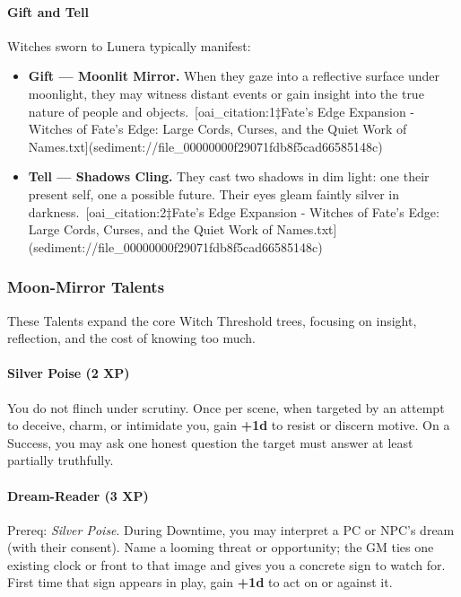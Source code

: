 \documentclass[11pt]{book}
\begin{document}
\paragraph{Gift and Tell}
Witches sworn to Lunera typically manifest:
\begin{itemize}[leftmargin=*]
  \item \textbf{Gift --- Moonlit Mirror.} When they gaze into a reflective surface under moonlight, they may witness distant events or gain insight into the true nature of people and objects.\ [oai_citation:1‡Fate's Edge Expansion - Witches of Fate's Edge: Large Cords, Curses, and the Quiet Work of Names.txt](sediment://file_00000000f29071fdb8f5cad66585148c)
  \item \textbf{Tell --- Shadows Cling.} They cast two shadows in dim light: one their present self, one a possible future. Their eyes gleam faintly silver in darkness.\ [oai_citation:2‡Fate's Edge Expansion - Witches of Fate's Edge: Large Cords, Curses, and the Quiet Work of Names.txt](sediment://file_00000000f29071fdb8f5cad66585148c)
\end{itemize}

\subsubsection{Moon-Mirror Talents}

These Talents expand the core Witch Threshold trees, focusing on insight, reflection, and the cost of knowing too much.

\paragraph{Silver Poise (2 XP)}
You do not flinch under scrutiny. Once per scene, when targeted by an attempt to deceive, charm, or intimidate you, gain \textbf{+1d} to resist or discern motive. On a Success, you may ask one honest question the target must answer at least partially truthfully.

\paragraph{Dream-Reader (3 XP)}
Prereq: \emph{Silver Poise}.  
During Downtime, you may interpret a PC or NPC's dream (with their consent). Name a looming threat or opportunity; the GM ties one existing clock or front to that image and gives you a concrete sign to watch for. First time that sign appears in play, gain \textbf{+1d} to act on or against it.
\end{document}
